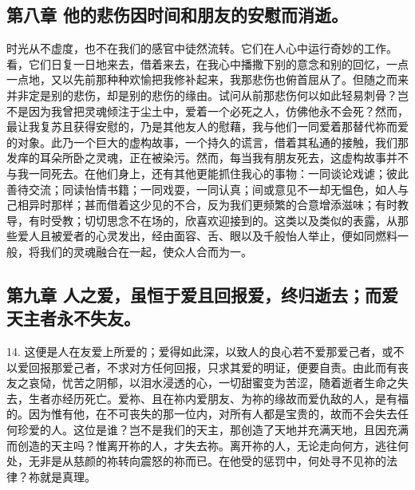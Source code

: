 
\subsection{第八章 他的悲伤因时间和朋友的安慰而消逝。}

时光从不虚度，也不在我们的感官中徒然流转。它们在人心中运行奇妙的工作。看，它们日复一日地来去，借着来去，在我心中播撒下别的意念和别的回忆，一点一点地，又以先前那种种欢愉把我修补起来，我那悲伤也俯首屈从了。但随之而来并非定是别的悲伤，却是别的悲伤的缘由。试问从前那悲伤何以如此轻易刺骨？岂不是因为我曾把灵魂倾注于尘土中，爱着一个必死之人，仿佛他永不会死？然而，最让我复苏且获得安慰的，乃是其他友人的慰藉，我与他们一同爱着那替代祢而爱的对象。此乃一个巨大的虚构故事，一个持久的谎言，借着其私通的接触，我们那发痒的耳朵所卧之灵魂，正在被染污。然而，每当我有朋友死去，这虚构故事并不与我一同死去。在他们身上，还有其他更能抓住我心的事物：一同谈论戏谑；彼此善待交流；同读怡情书籍；一同戏耍，一同认真；间或意见不一却无愠色，如人与己相异时那样；甚而借着这少见的不合，反为我们更频繁的合意增添滋味；有时教导，有时受教；切切思念不在场的，欣喜欢迎接到的。这类以及类似的表露，从那些爱人且被爱者的心灵发出，经由面容、舌、眼以及千般怡人举止，便如同燃料一般，将我们的灵魂融合在一起，使众人合而为一。\par


\subsection{第九章 人之爱，虽恒于爱且回报爱，终归逝去；而爱天主者永不失友。}

14. 这便是人在友爱上所爱的；爱得如此深，以致人的良心若不爱那爱己者，或不以爱回报那爱己者，不求对方任何回报，只求其爱的明证，便要自责。由此而有丧友之哀恸，忧苦之阴郁，以泪水浸透的心，一切甜蜜变为苦涩，随着逝者生命之失去，生者亦经历死亡。爱祢、且在祢内爱朋友、为祢的缘故而爱仇敌的人，是有福的。因为惟有他，在不可丧失的那一位内，对所有人都是宝贵的，故而不会失去任何珍爱的人。这位是谁？岂不是我们的天主，那创造了天地并充满天地，且因充满而创造的天主吗？惟离开祢的人，才失去祢。离开祢的人，无论走向何方，逃往何处，无非是从慈颜的祢转向震怒的祢而已。在他受的惩罚中，何处寻不见祢的法律？祢就是真理。\par

